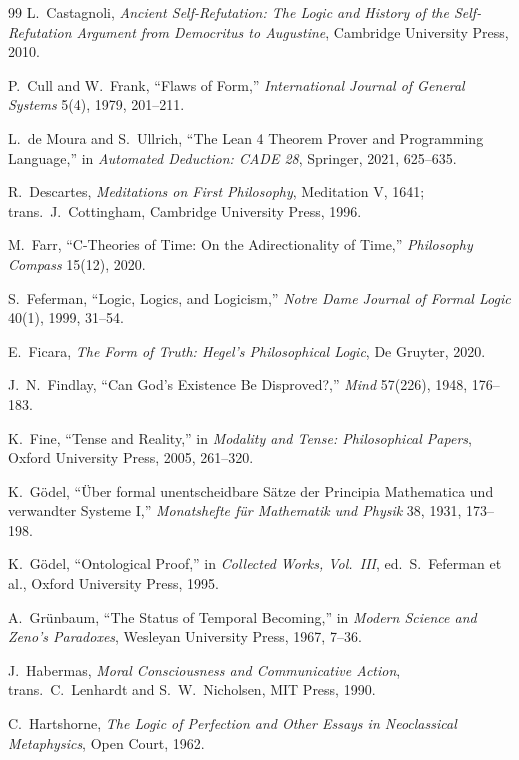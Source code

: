 \documentclass[11pt]{article}
\begin{document}
\begin{thebibliography}{99}
 L.\ Castagnoli, \emph{Ancient Self-Refutation: The Logic and History of the Self-Refutation Argument from Democritus to Augustine}, Cambridge University Press, 2010.

 P.\ Cull and W.\ Frank, ``Flaws of Form,'' \emph{International Journal of General Systems} 5(4), 1979, 201--211.

 L.\ de Moura and S.\ Ullrich, ``The Lean 4 Theorem Prover and Programming Language,'' in \emph{Automated Deduction: CADE 28}, Springer, 2021, 625--635.

 R.\ Descartes, \emph{Meditations on First Philosophy}, Meditation V, 1641; trans.\ J.\ Cottingham, Cambridge University Press, 1996.

 M.\ Farr, ``C-Theories of Time: On the Adirectionality of Time,'' \emph{Philosophy Compass} 15(12), 2020.

 S.\ Feferman, ``Logic, Logics, and Logicism,'' \emph{Notre Dame Journal of Formal Logic} 40(1), 1999, 31--54.

 E.\ Ficara, \emph{The Form of Truth: Hegel's Philosophical Logic}, De Gruyter, 2020.

 J.\ N.\ Findlay, ``Can God's Existence Be Disproved?,'' \emph{Mind} 57(226), 1948, 176--183.

 K.\ Fine, ``Tense and Reality,'' in \emph{Modality and Tense: Philosophical Papers}, Oxford University Press, 2005, 261--320.

 K.\ G\"odel, ``\"Uber formal unentscheidbare S\"atze der Principia Mathematica und verwandter Systeme I,'' \emph{Monatshefte f\"ur Mathematik und Physik} 38, 1931, 173--198.

 K.\ G\"odel, ``Ontological Proof,'' in \emph{Collected Works, Vol.\ III}, ed.\ S.\ Feferman et al., Oxford University Press, 1995.

 A.\ Gr\"unbaum, ``The Status of Temporal Becoming,'' in \emph{Modern Science and Zeno's Paradoxes}, Wesleyan University Press, 1967, 7--36.

 J.\ Habermas, \emph{Moral Consciousness and Communicative Action}, trans.\ C.\ Lenhardt and S.\ W.\ Nicholsen, MIT Press, 1990.

 C.\ Hartshorne, \emph{The Logic of Perfection and Other Essays in Neoclassical Metaphysics}, Open Court, 1962.


\end{thebibliography}
\end{document}

